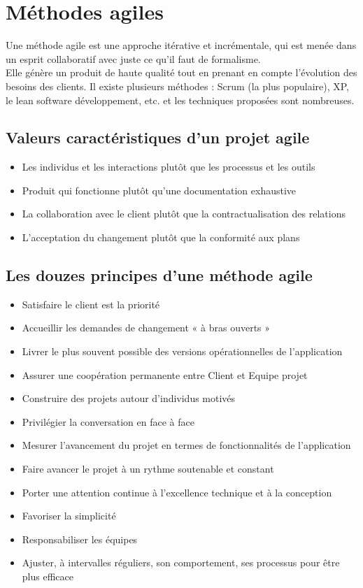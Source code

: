 \chapter{Méthodes agiles}
Une méthode agile est une approche itérative et incrémentale, qui est menée dans un esprit collaboratif avec juste ce qu’il faut de formalisme.\\
Elle génère un produit de haute qualité tout en prenant en compte l’évolution des besoins des clients. Il existe plusieurs méthodes : Scrum (la plus populaire), XP, le lean software développement, etc. et les techniques proposées sont nombreuses.

\section{Valeurs caractéristiques d’un projet agile}
\begin{itemize}[label=\textbullet]
\item Les individus et les interactions plutôt que les processus et les outils
\item Produit qui fonctionne plutôt qu’une documentation exhaustive
\item La collaboration avec le client plutôt que la contractualisation des relations
\item L’acceptation du changement plutôt que la conformité aux plans
\end{itemize}

\section{Les douzes principes d’une méthode agile}
\begin{itemize}[label=\textbullet]
\item Satisfaire le client est la priorité
\item Accueillir les demandes de changement « à bras ouverts »
\item Livrer le plus souvent possible des versions opérationnelles de l’application
\item Assurer une coopération permanente entre Client et Equipe projet
\item Construire des projets autour d’individus motivés
\item Privilégier la conversation en face à face
\item Mesurer l’avancement du projet en termes de fonctionnalités de l’application
\item Faire avancer le projet à un rythme soutenable et constant
\item Porter une attention continue à l’excellence technique et à la conception
\item Favoriser la simplicité
\item Responsabiliser les équipes
\item Ajuster, à intervalles réguliers, son comportement, ses processus pour être plus efficace
\end{itemize}

